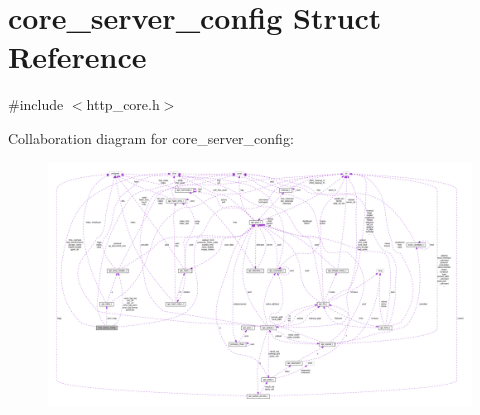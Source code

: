 \hypertarget{structcore__server__config}{}\section{core\+\_\+server\+\_\+config Struct Reference}
\label{structcore__server__config}


{\ttfamily \#include $<$http\+\_\+core.\+h$>$}



Collaboration diagram for core\+\_\+server\+\_\+config\+:
\nopagebreak
\begin{figure}[H]
\begin{center}
\leavevmode
\includegraphics[width=350pt]{structcore__server__config__coll__graph}
\end{center}
\end{figure}
